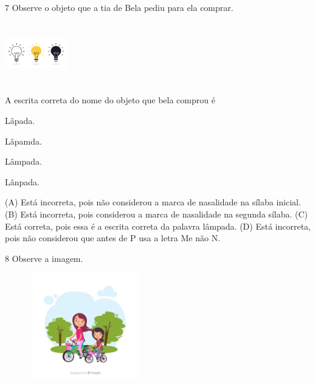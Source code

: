 \num{7} Observe o objeto que a tia de Bela pediu para ela comprar.

\includegraphics[width=1.07025in,height=1.04487in]{media/image178.jpeg}


A escrita correta do nome do objeto que bela comprou é

\begin{escolha}
\item Lâpada.

\item Lâpamda.

\item Lâmpada.

\item Lânpada.
\end{escolha}


(A) Está incorreta, pois não considerou a marca de nasalidade na sílaba inicial.
(B) Está incorreta, pois considerou a marca de nasalidade na segunda sílaba.
(C) Está correta, pois essa é a escrita correta da palavra lâmpada.
(D) Está incorreta, pois não considerou que antes de P usa a letra Me não N.

\num{8} Observe a imagem.

\includegraphics[width=2.76266in,height=1.82051in]{media/image179.png}

